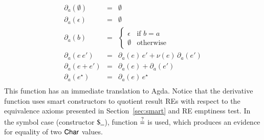 \documentclass[review]{elsarticle}
\newcommand{\D}[1]{\blue{\mathsf{#1}}}
\newcommand{\C}[1]{\red{\mathsf{#1}}}
\newcommand{\F}[1]{\green{\mathsf{#1}}}
\begin{document}
\[
\begin{array}{lclr}
  \partial_a(\emptyset) & = & \emptyset\\
  \partial_a(\epsilon) & = & \emptyset \\
  \partial_a(b) & = & \left\{
                      \begin{array}{lr}
                        \epsilon & \text{if } b = a\\
                        \emptyset & \text{otherwise}
                      \end{array}
                                \right. \\
  \partial_a(e\:e') & = & \partial_a(e)\,e' + \nu(e)\,\partial_a(e')\\
  \partial_a(e + e') & = & \partial_a(e) + \partial_a(e') \\
  \partial_a(e^\star) & = & \partial_a(e)\,e^\star\\
\end{array}
\]
This function has an immediate translation to Agda. Notice that the
derivative function uses smart constructors to quotient result REs
with respect to the equivalence axioms presented in
Section~\ref{sec:smart} and RE emptiness test. In the symbol case
(constructor \ensuremath{\C{\$\_}}), function \ensuremath{\F{\overset{?}{=}}} is used, which
produces an evidence for equality of two \ensuremath{\D{Char}} values.
\end{document}
